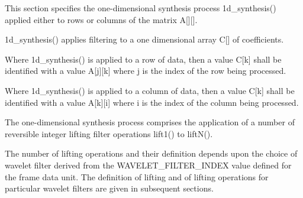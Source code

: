 This section specifies the one-dimensional synthesis process
1d\_synthesis() applied either to rows or columns of the matrix A[][].

1d\_synthesis() applies filtering to a one dimensional array C[] of
coefficients.

Where 1d\_synthesis() is applied to a row of data, then a value C[k]
shall be identified with a value A[j][k] where j is the index of the row
being processed.

Where 1d\_synthesis() is applied to a column of data, then a value C[k]
shall be identified with a value A[k][i] where i is the index of the
column being processed.

The one-dimensional synthesis process comprises the application of a
number of reversible integer lifting filter operations lift1() to
liftN().

The number of lifting operations and their definition depends upon the
choice of wavelet filter derived from the WAVELET\_FILTER\_INDEX value
defined for the frame data unit. The definition of lifting and of
lifting operations for particular wavelet filters are given in
subsequent sections.

